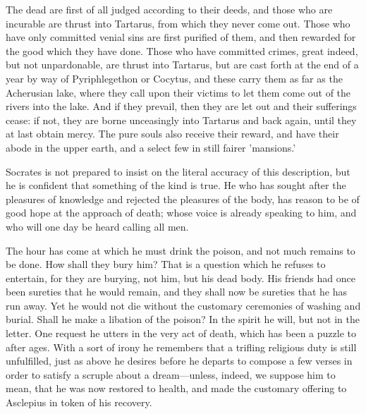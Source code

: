 The dead are first of all judged according to their deeds, and those who
are incurable are thrust into Tartarus, from which they never come out.
Those who have only committed venial sins are first purified of them, and
then rewarded for the good which they have done. Those who have committed
crimes, great indeed, but not unpardonable, are thrust into Tartarus, but
are cast forth at the end of a year by way of Pyriphlegethon or Cocytus,
and these carry them as far as the Acherusian lake, where they call upon
their victims to let them come out of the rivers into the lake. And if
they prevail, then they are let out and their sufferings cease: if not,
they are borne unceasingly into Tartarus and back again, until they at
last obtain mercy. The pure souls also receive their reward, and have
their abode in the upper earth, and a select few in still fairer
'mansions.'

Socrates is not prepared to insist on the literal accuracy of this
description, but he is confident that something of the kind is true. He
who has sought after the pleasures of knowledge and rejected the pleasures
of the body, has reason to be of good hope at the approach of death; whose
voice is already speaking to him, and who will one day be heard calling
all men.

The hour has come at which he must drink the poison, and not much remains
to be done. How shall they bury him? That is a question which he refuses
to entertain, for they are burying, not him, but his dead body. His
friends had once been sureties that he would remain, and they shall now be
sureties that he has run away. Yet he would not die without the customary
ceremonies of washing and burial. Shall he make a libation of the poison?
In the spirit he will, but not in the letter. One request he utters in the
very act of death, which has been a puzzle to after ages. With a sort of
irony he remembers that a trifling religious duty is still unfulfilled,
just as above he desires before he departs to compose a few verses in
order to satisfy a scruple about a dream—unless, indeed, we suppose
him to mean, that he was now restored to health, and made the customary
offering to Asclepius in token of his recovery.

